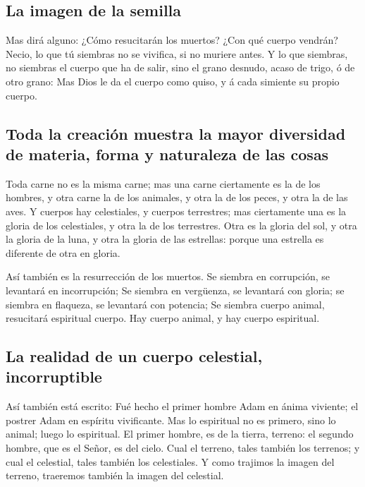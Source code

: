 \hypertarget{la-imagen-de-la-semilla}{%
\subsection{La imagen de la semilla}\label{la-imagen-de-la-semilla}}

 Mas dirá alguno: ¿Cómo resucitarán los muertos? ¿Con qué
cuerpo vendrán?  Necio, lo que tú siembras no se
vivifica, si no muriere antes.  Y lo que siembras, no
siembras el cuerpo que ha de salir, sino el grano desnudo, acaso de
trigo, ó de otro grano:  Mas Dios le da el cuerpo como
quiso, y á cada simiente su propio cuerpo.

\hypertarget{toda-la-creaciuxf3n-muestra-la-mayor-diversidad-de-materia-forma-y-naturaleza-de-las-cosas}{%
\subsection{Toda la creación muestra la mayor diversidad de materia,
forma y naturaleza de las
cosas}\label{toda-la-creaciuxf3n-muestra-la-mayor-diversidad-de-materia-forma-y-naturaleza-de-las-cosas}}

 Toda carne no es la misma carne; mas una carne
ciertamente es la de los hombres, y otra carne la de los animales, y
otra la de los peces, y otra la de las aves.  Y cuerpos
hay celestiales, y cuerpos terrestres; mas ciertamente una es la gloria
de los celestiales, y otra la de los terrestres.  Otra es
la gloria del sol, y otra la gloria de la luna, y otra la gloria de las
estrellas: porque una estrella es diferente de otra en gloria.

 Así también es la resurrección de los muertos. Se
siembra en corrupción, se levantará en incorrupción;  Se
siembra en vergüenza, se levantará con gloria; se siembra en flaqueza,
se levantará con potencia;  Se siembra cuerpo animal,
resucitará espiritual cuerpo. Hay cuerpo animal, y hay cuerpo
espiritual.

\hypertarget{la-realidad-de-un-cuerpo-celestial-incorruptible}{%
\subsection{La realidad de un cuerpo celestial,
incorruptible}\label{la-realidad-de-un-cuerpo-celestial-incorruptible}}

 Así también está escrito: Fué hecho el primer hombre
Adam en ánima viviente; el postrer Adam en espíritu vivificante.
 Mas lo espiritual no es primero, sino lo animal; luego
lo espiritual.  El primer hombre, es de la tierra,
terreno: el segundo hombre, que es el Señor, es del cielo.
 Cual el terreno, tales también los terrenos; y cual el
celestial, tales también los celestiales.  Y como
trajimos la imagen del terreno, traeremos también la imagen del
celestial.

